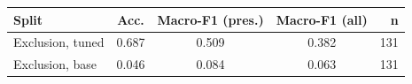 \begin{tabular}{lccc r}
\hline
Split & Acc. & Macro-F1 (pres.) & Macro-F1 (all) & n \\
\hline
Exclusion, tuned & 0.687 & 0.509 & 0.382 & 131 \\
Exclusion, base & 0.046 & 0.084 & 0.063 & 131 \\
\hline
\end{tabular}
